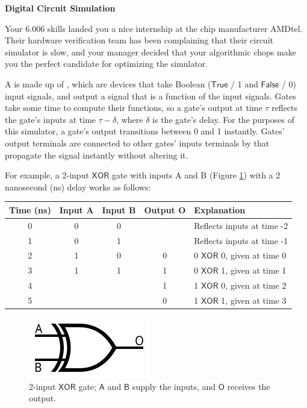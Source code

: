 \documentclass[12pt,twoside]{article}
\begin{document}
\begin{problems}


\problem {} \textbf{Digital Circuit Simulation}

Your 6.006 skills landed you a nice internship at the chip manufacturer AMDtel.
Their hardware verification team has been complaining that their circuit
simulator is slow, and your manager decided that your algorithmic chops make
you the perfect candidate for optimizing the simulator.

A  is made up of , which are devices that take Boolean
($\mathsf{True}$ / 1 and $\mathsf{False}$ / 0) input signals, and output a
signal that is a function of the input signals. Gates take some time to compute
their functions, so a gate's output at time $\tau$ reflects the gate's inputs at
time $\tau - \delta$, where $\delta$ is the gate's delay. For the purposes of
this simulator, a gate's output transitions between 0 and 1 instantly. Gates'
output terminals are connected to other gates' inputs terminals by 
that propagate the signal instantly without altering it.

For example, a 2-input $\mathsf{XOR}$ gate with inputs A and B (Figure
\ref{fig:xor}) with a 2 nanosecond (ns) delay works as follows: 

\begin{center}
\begin{tabular}{|c|c|c|c|l|}
\hline
Time (ns) & Input A & Input B & Output O & Explanation \\
\hline
0 & 0 & 0 &   & Reflects inputs at time -2 \\ 
1 & 0 & 1 &   & Reflects inputs at time -1 \\ 
2 & 1 & 0 & 0 & 0 $\mathsf{XOR}$ 0, given at time 0 \\
3 & 1 & 1 & 1 & 0 $\mathsf{XOR}$ 1, given at time 1 \\
4 &   &   & 1 & 1 $\mathsf{XOR}$ 0, given at time 2 \\
5 &   &   & 0 & 1 $\mathsf{XOR}$ 1, given at time 3 \\
\hline
\end{tabular}
\end{center}

\begin{figure}[htbp]
\centering
\includegraphics{figures/xor-ansi}
\caption{2-input $\mathsf{XOR}$ gate; $\mathsf{A}$ and $\mathsf{B}$ supply the
inputs, and $\mathsf{O}$ receives the output.}
\label{fig:xor}
\end{figure}  


\end{problems}
\end{document}
